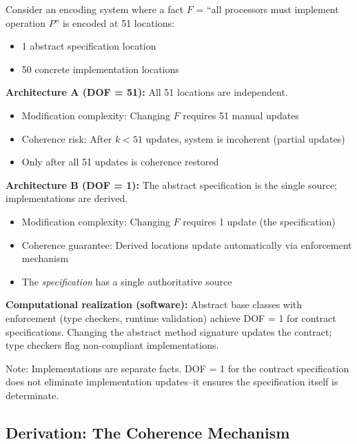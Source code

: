 \begin{example}\label{ex:ssot-large-m}
Consider an encoding system where a fact $F$ = ``all processors must implement operation $P$'' is encoded at 51 locations:
\begin{itemize}
\tightlist
\item 1 abstract specification location
\item 50 concrete implementation locations
\end{itemize}

\textbf{Architecture A (DOF = 51):} All 51 locations are independent.
\begin{itemize}
\tightlist
\item Modification complexity: Changing $F$ requires 51 manual updates
\item Coherence risk: After $k < 51$ updates, system is incoherent (partial updates)
\item Only after all 51 updates is coherence restored
\end{itemize}

\textbf{Architecture B (DOF = 1):} The abstract specification is the single source; implementations are derived.
\begin{itemize}
\tightlist
\item Modification complexity: Changing $F$ requires 1 update (the specification)
\item Coherence guarantee: Derived locations update automatically via enforcement mechanism
\item The \emph{specification} has a single authoritative source
\end{itemize}

\textbf{Computational realization (software):} Abstract base classes with enforcement (type checkers, runtime validation) achieve DOF = 1 for contract specifications. Changing the abstract method signature updates the contract; type checkers flag non-compliant implementations.

Note: Implementations are separate facts. DOF = 1 for the contract specification does not eliminate implementation updates--it ensures the specification itself is determinate.
\end{example}

\subsection{Derivation: The Coherence Mechanism}\label{sec:derivation}

